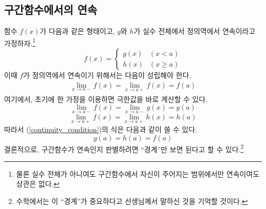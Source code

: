 \documentclass{scrartcl}
\begin{document}
\subsection{구간함수에서의 연속}
함수 \(f(x)\)가 다음과 같은 형태이고, \(g\)와 \(h\)가 실수 전체에서 정의역에서 연속이라고 가정하자.\footnote{물론 실수 전체가 아니여도 구간함수에서 자신이 주어지는 범위에서만 연속이여도 상관은 없다.}
\[
f(x)=\begin{cases}
g(x) & (x < a) \\
h(x) & (x \geq a)
\end{cases}
\]
이때 \(f\)가 정의역에서 연속이기 위해서는 다음이 성립해야 한다.
\begin{align}\label{continuity_condition}
\lim_{x\to a-} f(x) = \lim_{x\to a+} f(x) = f(a)
\end{align}
여기에서, 초기에 한 가정을 이용하면 극한값을 바로 계산할 수 있다.
\[
\lim_{x\to a-} f(x) = \lim_{x\to a-} g(x) = g(a)
\]
\[
\lim_{x\to a+} f(x) = \lim_{x\to a+} h(x) = h(a)
\]
따라서 (\ref{continuity_condition})의 식은 다음과 같이 쓸 수 있다.
\[
g(a) = h(a) = f(a)
\]
결론적으로, 구간함수가 연속인지 판별하려면 ``경계''만 보면 된다고 할 수 있다.\footnote{수학에서는 이 ``경계''가 중요하다고 선생님께서 말하신 것을 기억할 것이다.}
\end{document}
